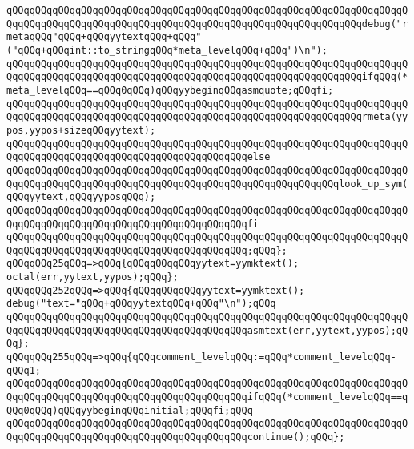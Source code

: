\verb|qQQqqQQqqQQqqQQqqQQqqQQqqQQqqQQqqQQqqQQqqQQqqQQqqQQqqQQqqQQqqQQqqQQqqQQqqQQqqQQqqQQqqQQqqQQqqQQqqQQqqQQqqQQqqQQqqQQqqQQqqQQqqQQqqQQqdebug("rmetaqQQq"qQQq+qQQqyytextqQQq+qQQq"("qQQq+qQQqint::to_stringqQQq*meta_levelqQQq+qQQq")\n");|\newline
\verb|qQQqqQQqqQQqqQQqqQQqqQQqqQQqqQQqqQQqqQQqqQQqqQQqqQQqqQQqqQQqqQQqqQQqqQQqqQQqqQQqqQQqqQQqqQQqqQQqqQQqqQQqqQQqqQQqqQQqqQQqqQQqqQQqqQQqifqQQq(*meta_levelqQQq==qQQq0qQQq)qQQqyybeginqQQqasmquote;qQQqfi;|\newline
\verb|qQQqqQQqqQQqqQQqqQQqqQQqqQQqqQQqqQQqqQQqqQQqqQQqqQQqqQQqqQQqqQQqqQQqqQQqqQQqqQQqqQQqqQQqqQQqqQQqqQQqqQQqqQQqqQQqqQQqqQQqqQQqqQQqqQQqrmeta(yypos,yypos+sizeqQQqyytext);|\newline
\verb|qQQqqQQqqQQqqQQqqQQqqQQqqQQqqQQqqQQqqQQqqQQqqQQqqQQqqQQqqQQqqQQqqQQqqQQqqQQqqQQqqQQqqQQqqQQqqQQqqQQqqQQqqQQqqQQqelse|\newline
\verb|qQQqqQQqqQQqqQQqqQQqqQQqqQQqqQQqqQQqqQQqqQQqqQQqqQQqqQQqqQQqqQQqqQQqqQQqqQQqqQQqqQQqqQQqqQQqqQQqqQQqqQQqqQQqqQQqqQQqqQQqqQQqqQQqlook_up_sym(qQQqyytext,qQQqyyposqQQq);|\newline
\verb|qQQqqQQqqQQqqQQqqQQqqQQqqQQqqQQqqQQqqQQqqQQqqQQqqQQqqQQqqQQqqQQqqQQqqQQqqQQqqQQqqQQqqQQqqQQqqQQqqQQqqQQqqQQqqQQqfi|\newline
\verb|qQQqqQQqqQQqqQQqqQQqqQQqqQQqqQQqqQQqqQQqqQQqqQQqqQQqqQQqqQQqqQQqqQQqqQQqqQQqqQQqqQQqqQQqqQQqqQQqqQQqqQQqqQQqqQQq;qQQq};|\newline
\verb|qQQqqQQq25qQQq=>qQQq{qQQqqQQqqQQqyytext=yymktext();|\newline
\verb|octal(err,yytext,yypos);qQQq};|\newline
\verb|qQQqqQQq252qQQq=>qQQq{qQQqqQQqqQQqyytext=yymktext();|\newline
\verb|debug("text="qQQq+qQQqyytextqQQq+qQQq"\n");qQQq|\newline
\verb|qQQqqQQqqQQqqQQqqQQqqQQqqQQqqQQqqQQqqQQqqQQqqQQqqQQqqQQqqQQqqQQqqQQqqQQqqQQqqQQqqQQqqQQqqQQqqQQqqQQqqQQqqQQqqQQqasmtext(err,yytext,yypos);qQQq};|\newline
\verb|qQQqqQQq255qQQq=>qQQq{qQQqcomment_levelqQQq:=qQQq*comment_levelqQQq-qQQq1;|\newline
\verb|qQQqqQQqqQQqqQQqqQQqqQQqqQQqqQQqqQQqqQQqqQQqqQQqqQQqqQQqqQQqqQQqqQQqqQQqqQQqqQQqqQQqqQQqqQQqqQQqqQQqqQQqqQQqqQQqifqQQq(*comment_levelqQQq==qQQq0qQQq)qQQqyybeginqQQqinitial;qQQqfi;qQQq|\newline
\verb|qQQqqQQqqQQqqQQqqQQqqQQqqQQqqQQqqQQqqQQqqQQqqQQqqQQqqQQqqQQqqQQqqQQqqQQqqQQqqQQqqQQqqQQqqQQqqQQqqQQqqQQqqQQqqQQqcontinue();qQQq};|\newline
